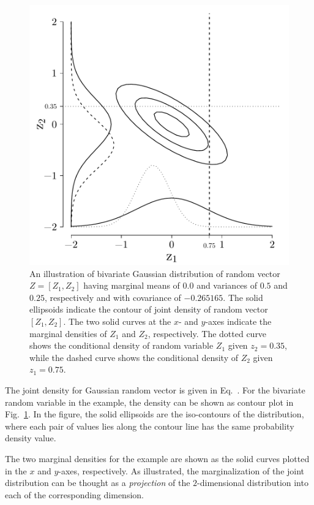 \begin{figure}[bth]
	\centering
	\includegraphics[scale=0.50]{../figures/chapter4/figures/plotBivariateNormal.pdf}
	\caption[Illustration of a bivariate Gaussian distribution]{An illustration of bivariate Gaussian distribution of random vector $Z = [Z_1, Z_2]$ having marginal means of $0.0$ and variances of $0.5$ and $0.25$, respectively and with covariance of $-0.265165$. The solid ellipsoids indicate the contour of joint density of random vector $[Z_1, Z_2]$. The two solid curves at the $x$- and $y$-axes indicate the marginal densities of $Z_1$ and $Z_2$, respectively. The dotted curve shows the conditional density of random variable $Z_1$ given $z_2 = 0.35$, while the dashed curve shows the conditional density of $Z_2$ given $z_1 = 0.75$.}
	\label{fig:plot_bivariate_normal}
\end{figure}

The joint density for Gaussian random vector is given in Eq.~.
For the bivariate random variable in the example, the density can be shown as contour plot in Fig.~\ref{fig:plot_bivariate_normal}.
In the figure, the solid ellipsoids are the iso-contours of the distribution, where each pair of values lies along the contour line has the same probability density value.

The two marginal densities for the example are shown as the solid curves plotted in the $x$ and $y$-axes, respectively.
As illustrated, the marginalization of the joint distribution can be thought as a \emph{projection} of the $2$-dimensional distribution into each of the corresponding dimension.

